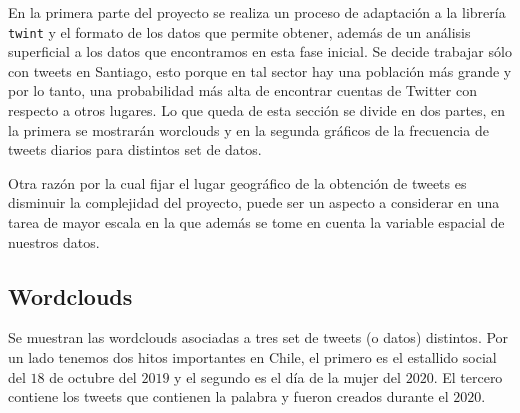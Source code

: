\documentclass{article}
\begin{document}
En la primera parte del proyecto se realiza un proceso de adaptación a la librería \texttt{twint} y el formato de los datos que permite obtener, además de un análisis superficial a los datos que encontramos en esta fase inicial. Se decide trabajar sólo con tweets en Santiago, esto porque en tal sector hay una población más grande y por lo tanto, una probabilidad más alta de encontrar cuentas de Twitter con respecto a otros lugares. Lo que queda de esta sección se divide en dos partes, en la primera se mostrarán worclouds y en la segunda gráficos de la frecuencia de tweets diarios para distintos set de datos.

\begin{remark}
	Otra razón por la cual fijar el lugar geográfico de la obtención de tweets es disminuir la complejidad del proyecto, puede ser un aspecto a considerar en una tarea de mayor escala en la que además se tome en cuenta la variable espacial de nuestros datos.	
\end{remark}

\subsection{Wordclouds}
	Se muestran las wordclouds asociadas a tres set de tweets (o datos) distintos. Por un lado tenemos dos hitos importantes en Chile, el primero es el estallido social del $18$ de octubre del $2019$ y el segundo es el día de la mujer del $2020$. El tercero contiene los tweets que contienen la palabra  y fueron creados durante el $2020$.
	
	
	
\end{document}
